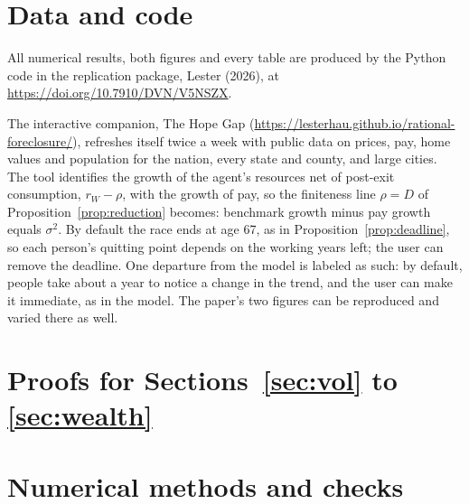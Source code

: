 \documentclass[12pt]{article}
\theoremstyle{definition}
\theoremstyle{remark}
\theoremstyle{plain}
\theoremstyle{definition}
\begin{document}
\section*{Data and code}
All numerical results, both figures and every table are produced by the Python code in the replication package, Lester (2026), at \url{https://doi.org/10.7910/DVN/V5NSZX}.

The interactive companion, The Hope Gap (\url{https://lesterhau.github.io/rational-foreclosure/}), refreshes itself twice a week with public data on prices, pay, home values and population for the nation, every state and county, and large cities. The tool identifies the growth of the agent's resources net of post-exit consumption, $r_W-\rho$, with the growth of pay, so the finiteness line $\rho=D$ of Proposition~\ref{prop:reduction} becomes: benchmark growth minus pay growth equals $\sigma^2$. By default the race ends at age 67, as in Proposition~\ref{prop:deadline}, so each person's quitting point depends on the working years left; the user can remove the deadline. One departure from the model is labeled as such: by default, people take about a year to notice a change in the trend, and the user can make it immediate, as in the model. The paper's two figures can be reproduced and varied there as well.

\clearpage
\appendix


\clearpage
\section{Proofs for Sections~\ref{sec:vol} to \ref{sec:wealth}}\label{app:B}


\clearpage
\section{Numerical methods and checks}\label{app:C}


\clearpage

\end{document}
